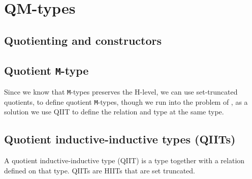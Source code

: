 \documentclass[twoside,11pt,openright]{report}
\theoremstyle{plain} %
\theoremstyle{definition}
\theoremstyle{remark}
\begin{document}

\chapter{QM-types}
\section{Quotienting and constructors}
\section{Quotient \texttt{M}-type}
Since we know that \texttt{M}-types preserves the H-level, we can use set-truncated quotients, to define quotient \texttt{M}-types, though we run into the problem of , as a solution we use QIIT to define the relation and type at the same type.

\section{Quotient inductive-inductive types (QIITs)}
A quotient inductive-inductive type (QIIT) is a type together with a relation defined on that type. QIITs are HIITs that are set truncated.
\end{document}
